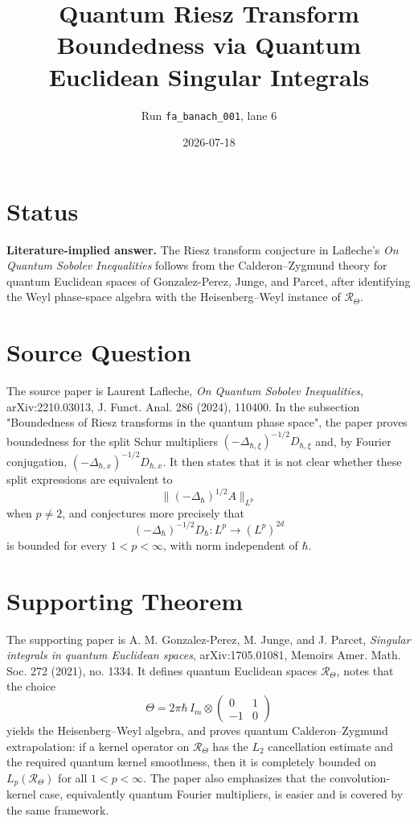 \documentclass[11pt]{article}
\title{Quantum Riesz Transform Boundedness via Quantum Euclidean Singular Integrals}
\author{Run \texttt{fa\_banach\_001}, lane 6}
\date{2026-07-18}
\newcommand{\DD}{\Delta_{\hbar}}
\newcommand{\Dh}{D_{\hbar}}
\newcommand{\Lp}{L^p}
\begin{document}
\maketitle

\section*{Status}

\textbf{Literature-implied answer.}  The Riesz transform conjecture in
Lafleche's \emph{On Quantum Sobolev Inequalities} follows from the
Calderon--Zygmund theory for quantum Euclidean spaces of Gonzalez-Perez,
Junge, and Parcet, after identifying the Weyl phase-space algebra with the
Heisenberg--Weyl instance of \(\mathcal R_\Theta\).

\section*{Source Question}

The source paper is Laurent Lafleche, \emph{On Quantum Sobolev Inequalities},
arXiv:2210.03013, J. Funct. Anal. 286 (2024), 110400.  In the subsection
"Boundedness of Riesz transforms in the quantum phase space", the paper proves
boundedness for the split Schur multipliers
\((-\Delta_{\hbar,\xi})^{-1/2}D_{\hbar,\xi}\) and, by Fourier conjugation,
\((-\Delta_{\hbar,x})^{-1/2}D_{\hbar,x}\).  It then states that it is not clear
whether these split expressions are equivalent to
\[
  \|(-\DD)^{1/2}A\|_{\Lp}
\]
when \(p\ne 2\), and conjectures more precisely that
\[
  (-\DD)^{-1/2}\Dh:\Lp\longrightarrow(\Lp)^{2d}
\]
is bounded for every \(1<p<\infty\), with norm independent of \(\hbar\).

\section*{Supporting Theorem}

The supporting paper is A. M. Gonzalez-Perez, M. Junge, and J. Parcet,
\emph{Singular integrals in quantum Euclidean spaces}, arXiv:1705.01081,
Memoirs Amer. Math. Soc. 272 (2021), no. 1334.  It defines quantum Euclidean
spaces \(\mathcal R_\Theta\), notes that the choice
\[
  \Theta = 2\pi\hbar\, I_m\otimes
  \begin{pmatrix}0&1\\ -1&0\end{pmatrix}
\]
yields the Heisenberg--Weyl algebra, and proves quantum
Calderon--Zygmund extrapolation: if a kernel operator on \(\mathcal R_\Theta\)
has the \(L_2\) cancellation estimate and the required quantum kernel
smoothness, then it is completely bounded on \(L_p(\mathcal R_\Theta)\) for
all \(1<p<\infty\).  The paper also emphasizes that the convolution-kernel
case, equivalently quantum Fourier multipliers, is easier and is covered by
the same framework.
\end{document}
